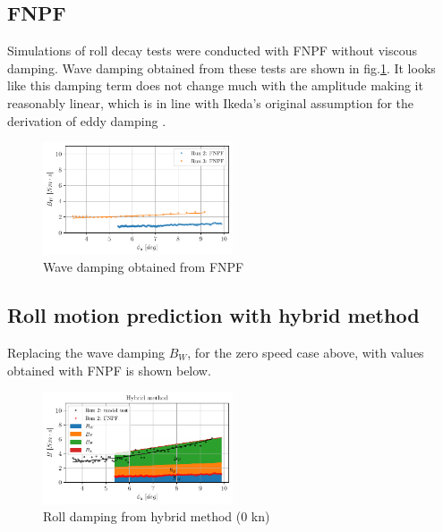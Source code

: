     \subsection{FNPF}\label{fnpf}

Simulations of roll decay tests were conducted with FNPF without viscous
damping. Wave damping obtained from these tests are shown in
fig.\ref{fig:fnpf}. It looks like this damping term does not
change much with the amplitude making it reasonably linear, which is in
line with Ikeda's original assumption for the derivation of eddy damping
\cite{7505983/4AFVVGNT}.

    

    \begin{figure}[H]
        \begin{center}\includegraphics[width = 0.5\textwidth]{figures/fnpf.pdf}\end{center}
        \vspace{-1cm}
        \caption{Wave damping obtained from FNPF}
        \label{fig:fnpf}
    \end{figure}
    
    \subsection{Roll motion prediction with hybrid
method}\label{roll-motion-prediction-with-hybrid-method}
Replacing the wave damping $B_W$, for the zero speed case above, with values obtained with FNPF is shown below. 
    \begin{figure}[H]
        \begin{center}\includegraphics[width = 0.5\textwidth]{figures/hybrid_0.pdf}\end{center}
        \vspace{-1cm}
        \caption{Roll damping from hybrid method (0 kn)}
        \label{fig:hybrid_0}
    \end{figure}
    
